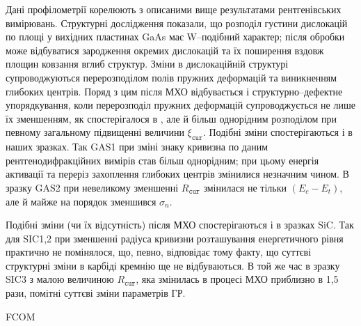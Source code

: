 \documentclass[a4paper,14pt,oneside,openany]{memoir}
\begin{document}
Дані профілометрії корелюють з описаними вище результатами рентгенівських вимірювань.
Структурні дослідження показали, що розподіл густини дислокацій по площі у вихідних пластинах GaAs має W--подібний характер;
після обробки може відбуватися зародження окремих дислокацій та їх поширення вздовж площин ковзання вглиб структур.
Зміни в дислокаційній структурі супроводжуються перерозподілом полів пружних деформацій та виникненням глибоких центрів.
Поряд з цим після МХО відбувається і структурно--дефектне упорядкування, коли
перерозподіл пружних деформацій супроводжується не лише їх зменшенням, як спостерігалося в \cite{Bacherikov2003r,Pashkov1994r,Boltovets,Kr1996,Milenin1994,BelyaevIntac},
але й більш однорідним розподілом при певному загальному підвищенні величини $\xi_\mathtt{cur}$.
Подібні зміни спостерігаються і в наших зразках.
Так GAS1 при зміні знаку кривизна по даним рентгенодифракційних вимірів став більш однорідним;
при цьому енергія активації та переріз захоплення глибоких центрів змінилися незначним чином.
В зразку GAS2 при невеликому зменшенні $R_\mathtt{cur}$ змінилася не тільки $(E_c-E_t)$, але й майже на порядок зменшився $\sigma_n$.

Подібні зміни (чи їх відсутність) після МХО спостерігаються і в зразках SiC.
Так для SIC1,2 при зменшенні радіуса кривизни розташування енергетичного рівня практично не помінялося, що, певно,
відповідає тому  факту, що суттєві структурні зміни в карбіді кремнію ще не відбуваються.
В той же час в зразку  SIC3 з малою величиною $R_\mathtt{cur}$, яка змінилась в процесі МХО приблизно в 1,5 рази,
помітні суттєві зміни параметрів ГР.



\cite{KorshunovBook,Kozlovs,Zaveryukhin2002:2,OlikhFTT,Boltovets,Bacherikov2003r,Belyaev1998JTFr,Saiko1993,OlikhSSC,
Rzanov,Shishiyanu,Vaitkus,Samoilov1994,ZOHM2000}

FCOM
\cite{Rjanov1981,paton1993,Vinnik1989,ZOHM2000,BHUNIA1998,Bacherikov2003r,Pashkov1994r,Boltovets,Kr1996,Milenin1994,
BelyaevIntac,ASHKINADZE1996,ProcSPIE,Venger1999,Godwod,ThoricBook,BergBook,Lebed1999,Anikin1991:2,
Anikin1991:3,Lebedev2001}
\end{document}
